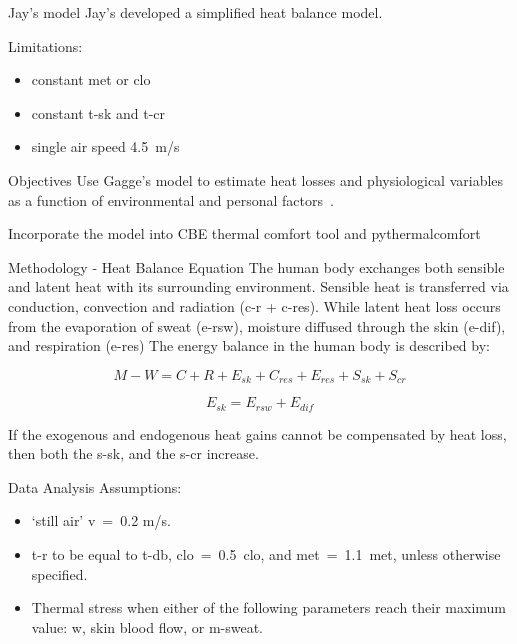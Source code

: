 \documentclass[aspectratio=169]{beamer}
\begin{document}
    \begin{frame}{Jay's model}
        Jay's developed a simplified heat balance model.

        Limitations:
        \begin{itemize}
            \item constant \ac{met} or \ac{clo}
            \item constant \ac{t-sk} and \ac{t-cr}
            \item single air speed 4.5~m/s
        \end{itemize}
    \end{frame}

    \begin{frame}{Objectives}
        Use Gagge's model to estimate heat losses and physiological variables as a function of environmental and personal factors~\cite{Gagge1986}.

        Incorporate the model into CBE thermal comfort tool and pythermalcomfort
    \end{frame}

    \begin{frame}{Methodology - Heat Balance Equation}
        The human body exchanges both sensible and latent heat with its surrounding environment.
        Sensible heat is transferred via conduction, convection and radiation (\acs{c-r} + \acs{c-res}).
        While latent heat loss occurs from the evaporation of sweat (\acs{e-rsw}), moisture diffused through the skin  (\acs{e-dif}), and respiration (\acs{e-res})
        The energy balance in the human body is described by:

        \begin{equation}
            M - W = C + R + E_{sk} + C_{res} + E_{res} + S_{sk} + S_{cr}\label{eq:heat-balance}
        \end{equation}

        \begin{equation}
            E_{s k}=E_{rsw}+E_{dif}
        \end{equation}

        If the exogenous and endogenous heat gains cannot be compensated by heat loss, then both the \ac{s-sk}, and the \ac{s-cr} increase.
    \end{frame}

    \begin{frame}{Data Analysis}
        Assumptions:
        \begin{itemize}
            \item `still air' \ac{v}~=~0.2 m/s.
            \item \ac{t-r} to be equal to \ac{t-db}, \ac{clo}~=~0.5~clo, and \ac{met}~=~1.1~met, unless otherwise specified.
            \item Thermal stress when either of the following parameters reach their maximum value: \ac{w}, skin blood flow, or \ac{m-sweat}.
        \end{itemize}
    \end{frame}
\end{document}

